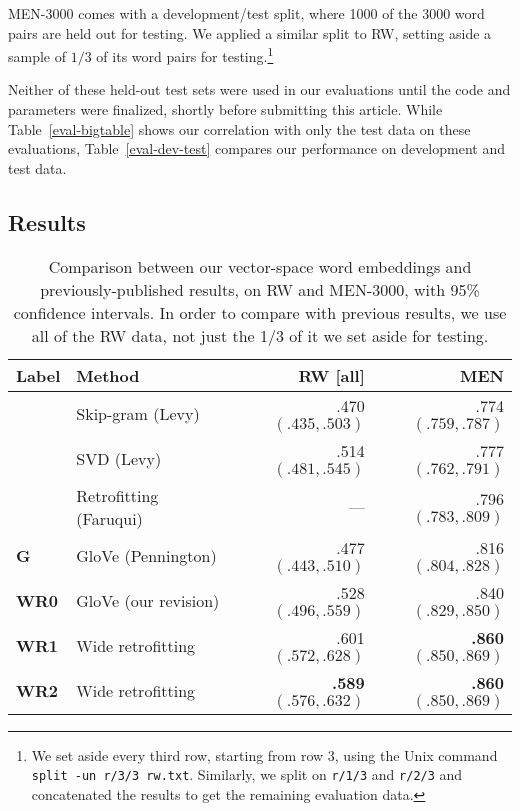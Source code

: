 \documentclass[11pt,letterpaper]{article}
\begin{document}
MEN-3000 comes with a development/test split, where 1000 of the 3000 word pairs
are held out for testing. We applied a similar split to RW, setting aside a
sample of $1/3$ of its word pairs for testing.\footnote{
    We set aside every third row, starting from row 3, using the Unix command
    {\tt split -un r/3/3 rw.txt}. Similarly, we split on {\tt r/1/3} and
    {\tt r/2/3} and concatenated the results to get the remaining evaluation
    data.
}

Neither of these held-out test sets were used in our evaluations until the code
and parameters were finalized, shortly before submitting this article. While
Table~\ref{eval-bigtable} shows our correlation with only the test data on these
evaluations, Table~\ref{eval-dev-test} compares our performance on development
and test data.

\subsection{Results}


\begin{table}[t]
\centering
\begin{tabular}{llrr}
\toprule
Label     & Method                 & RW [all] &      MEN \\
\midrule
          & Skip-gram (Levy)       &     .470 $(.435, .503)$ &     .774 $(.759, .787)$ \\
          & SVD (Levy)             &     .514 $(.481, .545)$ &     .777 $(.762, .791)$ \\
          & Retrofitting (Faruqui) &      ---                &     .796 $(.783, .809)$ \\
\bf G     & GloVe (Pennington)     &     .477 $(.443, .510)$ &     .816 $(.804, .828)$ \\
\bf WR0   & GloVe (our revision)   &     .528 $(.496, .559)$ &     .840 $(.829, .850)$ \\
\bf WR1   & Wide retrofitting      &     .601 $(.572, .628)$ &{\bf .860}$(.850, .869)$ \\
\bf WR2   & Wide retrofitting      &{\bf .589}$(.576, .632)$ &{\bf .860}$(.850, .869)$ \\
\bottomrule
\end{tabular}

\caption{
    Comparison between our vector-space word embeddings and previously-published
    results, on RW and MEN-3000, with 95\% confidence intervals. In order to compare
    with previous results, we use all of the RW data, not just the 1/3 of it we set
    aside for testing.
}
\label{compare-others}
\end{table}
\end{document}
